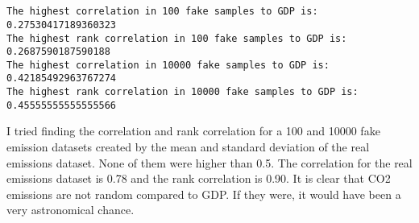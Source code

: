 \documentclass[11pt]{article}
\begin{document}
    \begin{center}
    \end{center}
    { \hspace*{\fill} \\}
    
    \begin{center}
    \end{center}
    { \hspace*{\fill} \\}
    
    \begin{Verbatim}[commandchars=\\\{\}]
The highest correlation in 100 fake samples to GDP is: 0.27530417189360323
The highest rank correlation in 100 fake samples to GDP is: 0.2687590187590188
The highest correlation in 10000 fake samples to GDP is: 0.42185492963767274
The highest rank correlation in 10000 fake samples to GDP is: 0.45555555555555566

    \end{Verbatim}

    I tried finding the correlation and rank correlation for a 100 and 10000
fake emission datasets created by the mean and standard deviation of the
real emissions dataset. None of them were higher than 0.5. The
correlation for the real emissions dataset is 0.78 and the rank
correlation is 0.90. It is clear that CO2 emissions are not random
compared to GDP. If they were, it would have been a very astronomical
chance.
\end{document}
